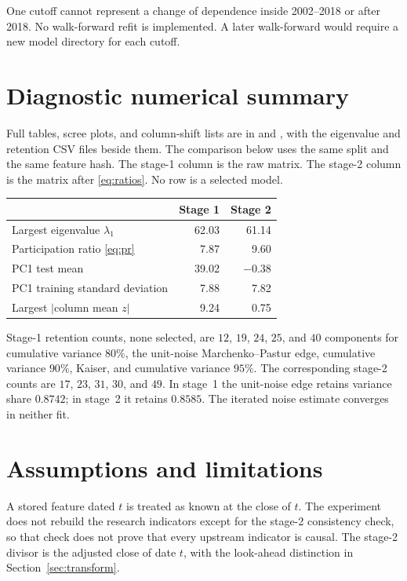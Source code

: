 \documentclass[11pt]{article}
\begin{document}
One cutoff cannot represent a change of dependence inside 2002--2018 or after 2018.
No walk-forward refit is implemented.
A later walk-forward would require a new model directory for each cutoff.

\section{Diagnostic numerical summary}
\label{sec:numbers}

Full tables, scree plots, and column-shift lists are in  and , with the eigenvalue and retention CSV files beside them.
The comparison below uses the same split and the same feature hash.
The stage-1 column is the raw matrix.
The stage-2 column is the matrix after \eqref{eq:ratios}.
No row is a selected model.

\begin{center}
\begin{tabular}{lrr}
\toprule
 & Stage 1 & Stage 2 \\
\midrule
Largest eigenvalue \(\lambda_1\) & 62.03 & 61.14 \\
Participation ratio \eqref{eq:pr} & 7.87 & 9.60 \\
PC1 test mean & 39.02 & \(-0.38\) \\
PC1 training standard deviation & 7.88 & 7.82 \\
Largest \(|\)column mean \(z|\) & 9.24 & 0.75 \\
\bottomrule
\end{tabular}
\end{center}

Stage-1 retention counts, none selected, are \(12\), \(19\), \(24\), \(25\), and \(40\) components for cumulative variance \(80\%\), the unit-noise Marchenko--Pastur edge, cumulative variance \(90\%\), Kaiser, and cumulative variance \(95\%\).
The corresponding stage-2 counts are \(17\), \(23\), \(31\), \(30\), and \(49\).
In stage~1 the unit-noise edge retains variance share \(0.8742\); in stage~2 it retains \(0.8585\).
The iterated noise estimate converges in neither fit.

\section{Assumptions and limitations}

A stored feature dated \(t\) is treated as known at the close of \(t\).
The experiment does not rebuild the research indicators except for the stage-2 consistency check, so that check does not prove that every upstream indicator is causal.
The stage-2 divisor is the adjusted close of date \(t\), with the look-ahead distinction in Section~\ref{sec:transform}.
\end{document}

